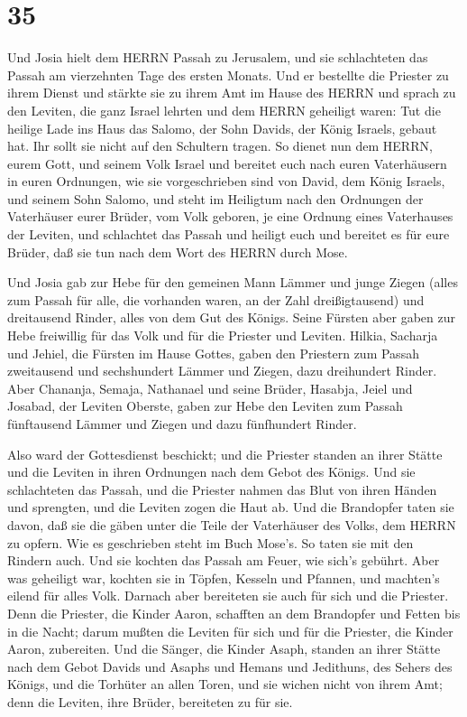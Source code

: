 \hypertarget{section-34}{%
\section{35}\label{section-34}}

 Und Josia hielt dem HERRN Passah zu Jerusalem, und sie
schlachteten das Passah am vierzehnten Tage des ersten Monats.
 Und er bestellte die Priester zu ihrem Dienst und stärkte
sie zu ihrem Amt im Hause des HERRN  und sprach zu den
Leviten, die ganz Israel lehrten und dem HERRN geheiligt waren: Tut die
heilige Lade ins Haus das Salomo, der Sohn Davids, der König Israels,
gebaut hat. Ihr sollt sie nicht auf den Schultern tragen. So dienet nun
dem HERRN, eurem Gott, und seinem Volk Israel  und bereitet
euch nach euren Vaterhäusern in euren Ordnungen, wie sie vorgeschrieben
sind von David, dem König Israels, und seinem Sohn Salomo, 
und steht im Heiligtum nach den Ordnungen der Vaterhäuser eurer Brüder,
vom Volk geboren, je eine Ordnung eines Vaterhauses der Leviten,
 und schlachtet das Passah und heiligt euch und bereitet es
für eure Brüder, daß sie tun nach dem Wort des HERRN durch Mose.

 Und Josia gab zur Hebe für den gemeinen Mann Lämmer und
junge Ziegen (alles zum Passah für alle, die vorhanden waren, an der
Zahl dreißigtausend) und dreitausend Rinder, alles von dem Gut des
Königs.  Seine Fürsten aber gaben zur Hebe freiwillig für
das Volk und für die Priester und Leviten. Hilkia, Sacharja und Jehiel,
die Fürsten im Hause Gottes, gaben den Priestern zum Passah zweitausend
und sechshundert Lämmer und Ziegen, dazu dreihundert Rinder.
 Aber Chananja, Semaja, Nathanael und seine Brüder, Hasabja,
Jeiel und Josabad, der Leviten Oberste, gaben zur Hebe den Leviten zum
Passah fünftausend Lämmer und Ziegen und dazu fünfhundert Rinder.

 Also ward der Gottesdienst beschickt; und die Priester
standen an ihrer Stätte und die Leviten in ihren Ordnungen nach dem
Gebot des Königs.  Und sie schlachteten das Passah, und die
Priester nahmen das Blut von ihren Händen und sprengten, und die Leviten
zogen die Haut ab.  Und die Brandopfer taten sie davon, daß
sie die gäben unter die Teile der Vaterhäuser des Volks, dem HERRN zu
opfern. Wie es geschrieben steht im Buch Mose's. So taten sie mit den
Rindern auch.  Und sie kochten das Passah am Feuer, wie
sich's gebührt. Aber was geheiligt war, kochten sie in Töpfen, Kesseln
und Pfannen, und machten's eilend für alles Volk.  Darnach
aber bereiteten sie auch für sich und die Priester. Denn die Priester,
die Kinder Aaron, schafften an dem Brandopfer und Fetten bis in die
Nacht; darum mußten die Leviten für sich und für die Priester, die
Kinder Aaron, zubereiten.  Und die Sänger, die Kinder
Asaph, standen an ihrer Stätte nach dem Gebot Davids und Asaphs und
Hemans und Jedithuns, des Sehers des Königs, und die Torhüter an allen
Toren, und sie wichen nicht von ihrem Amt; denn die Leviten, ihre
Brüder, bereiteten zu für sie.


